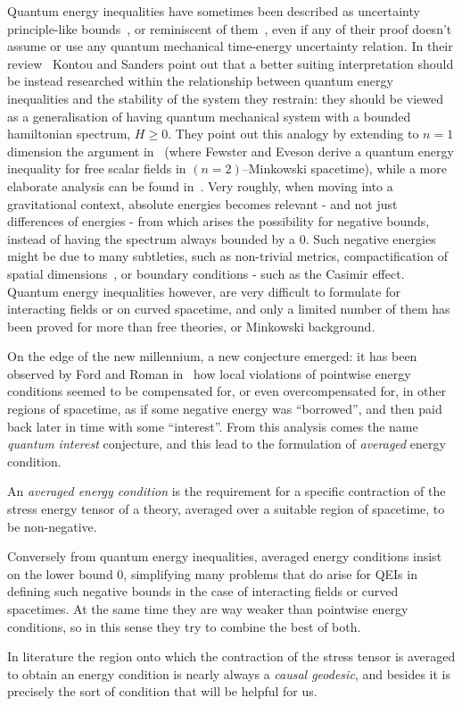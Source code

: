 Quantum energy inequalities have sometimes been described as uncertainty principle-like bounds~\cite[]{ford1998quantum}, or reminiscent of them~\cite[]{fewster1999bounds}, even if any of their proof doesn't assume or use any quantum mechanical time-energy uncertainty relation.
In their review~\cite[]{kontou2020energy} Kontou and Sanders point out that a better suiting interpretation should be instead researched within the relationship between quantum energy inequalities and the stability of the system they restrain: they should be viewed as a generalisation of having quantum mechanical system with a bounded hamiltonian spectrum, \(H \ge 0\). They point out this analogy by extending to \(n = 1\) dimension the argument in~\cite[]{fewster1998bounds} (where Fewster and Eveson derive a quantum energy inequality for free scalar fields in \((n = 2)\)--Minkowski spacetime), while a more elaborate analysis can be found in~\cite[]{fewster2003stability}. Very roughly, when moving into a gravitational context, absolute energies becomes relevant - and not just differences of energies - from which arises the possibility for negative bounds, instead of having the spectrum always bounded by a \(0\). Such negative energies might be due to many subtleties, such as non-trivial metrics, compactification of spatial dimensions~\cite[]{banach1979vacuum, louko1998inextendible}, or boundary conditions - such as the Casimir effect. Quantum energy inequalities however, are very difficult to formulate for interacting fields or on curved spacetime, and only a limited number of them has been proved for more than free theories, or Minkowski background. 

On the edge of the new millennium, a new conjecture emerged: it has been observed by Ford and Roman in~\cite[]{ford1999quantum} how local violations of pointwise energy conditions seemed to be compensated for, or even overcompensated for, in other regions of spacetime, as if some negative energy was ``borrowed'', and then paid back later in time with some ``interest''. From this analysis comes the name \emph{quantum interest} conjecture, and this lead to the formulation of \emph{averaged} energy condition.
\begin{definition}
    An \emph{averaged energy condition} is the requirement for a specific contraction of the stress energy tensor of a theory, averaged over a suitable region of spacetime, to be non-negative.
\end{definition}
\begin{remark}
    Conversely from quantum energy inequalities, averaged energy conditions insist on the lower bound \(0\), simplifying many problems that do arise for QEIs in defining such negative bounds in the case of interacting fields or curved spacetimes. At the same time they are way weaker than pointwise energy conditions, so in this sense they try to combine the best of both.
\end{remark}
In literature the region onto which the contraction of the stress tensor is averaged to obtain an energy condition is nearly always a \emph{causal geodesic}, and besides it is precisely the sort of condition that will be helpful for us.

